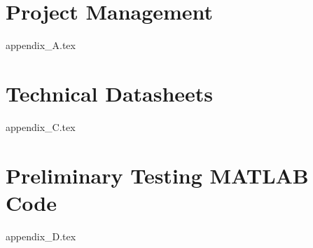 \appendix
\appendixpage
\section{Project Management}
{appendix_A.tex}
\newpage\section{Technical Datasheets}
{appendix_C.tex}
\section{Preliminary Testing MATLAB Code}
{appendix_D.tex}
